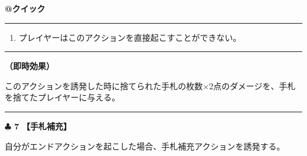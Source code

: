 \documentclass[twocolumn,a5paper,papersize,10pt]{jarticle}
\begin{document}
\vspace{-1zh}

 
 
\begin{tcolorbox}[title={\small\bf【Action】暴動}{\scriptsize （誘発）}]

{\scriptsize\bf @クイック }

\vspace{1mm} %
\hrule height 0.1mm depth 0mm width 62mm %
\vspace{1mm} %


\vspace{-1zh}%
\begin{enumerate}
\renewcommand{\labelenumi}{※}
\setlength{\leftskip}{-0.3cm}
\setlength{\itemsep}{0pt} %
\setlength{\parskip}{0pt} %

\item プレイヤーはこのアクションを直接起こすことができない。

\vspace{-3mm}%
\end{enumerate}
\vspace{-2mm} %
\vspace{1zh}%
\vspace{1mm} %
\hrule height 0.1mm depth 0mm width 62mm %
\vspace{1mm} %

{\bf（即時効果）}

このアクションを誘発した時に捨てられた手札の枚数×2点のダメージを、手札を捨てたプレイヤーに与える。

\vspace{1mm} %
\end{tcolorbox}

\vspace{-1zh}

 
 
 

\vspace{3mm} %
\hrule height 0.5mm depth 0mm width 66.5mm %
\vspace{1mm} %
{\Large\bf $\clubsuit$ 7} {\normalsize\bf【手札補充】} %
\vspace{1mm} %

自分がエンドアクションを起こした場合、手札補充アクションを誘発する。
\end{document}
